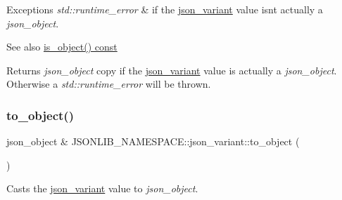 \begin{DoxyExceptions}{Exceptions}
{\em std\+::runtime\+\_\+error} & if the \hyperlink{classJSONLIB__NAMESPACE_1_1json__variant}{json\+\_\+variant} value isn\textquotesingle{}t actually a {\itshape json\+\_\+object}. \\
\hline
\end{DoxyExceptions}
\begin{DoxySeeAlso}{See also}
\hyperlink{classJSONLIB__NAMESPACE_1_1json__variant_a28b4156626bd9f0e344ba1704c7590f3}{is\+\_\+object() const} 
\end{DoxySeeAlso}
\begin{DoxyReturn}{Returns}
{\itshape json\+\_\+object} copy if the \hyperlink{classJSONLIB__NAMESPACE_1_1json__variant}{json\+\_\+variant} value is actually a {\itshape json\+\_\+object}. Otherwise a {\itshape std\+::runtime\+\_\+error} will be thrown. 
\end{DoxyReturn}
\mbox{\label{classJSONLIB__NAMESPACE_1_1json__variant_a05536ef12c8da052e4716087651b43ad}} 
\subsubsection{\texorpdfstring{to\+\_\+object()}{to\_object()}\hspace{0.1cm}{\footnotesize\ttfamily [2/2]}}
{\footnotesize\ttfamily json\+\_\+object \& J\+S\+O\+N\+L\+I\+B\+\_\+\+N\+A\+M\+E\+S\+P\+A\+C\+E\+::json\+\_\+variant\+::to\+\_\+object (\begin{DoxyParamCaption}{ }\end{DoxyParamCaption})}



Casts the \hyperlink{classJSONLIB__NAMESPACE_1_1json__variant}{json\+\_\+variant} value to {\itshape json\+\_\+object}. 


